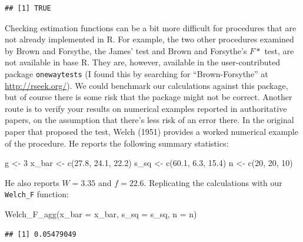 \documentclass[
]{book}
\newenvironment{Shaded}{\begin{snugshade}}{\end{snugshade}}
\newcommand{\AttributeTok}[1]{\textcolor[rgb]{0.77,0.63,0.00}{#1}}
\newcommand{\DecValTok}[1]{\textcolor[rgb]{0.00,0.00,0.81}{#1}}
\newcommand{\FloatTok}[1]{\textcolor[rgb]{0.00,0.00,0.81}{#1}}
\newcommand{\FunctionTok}[1]{\textcolor[rgb]{0.00,0.00,0.00}{#1}}
\newcommand{\NormalTok}[1]{#1}
\newcommand{\OtherTok}[1]{\textcolor[rgb]{0.56,0.35,0.01}{#1}}
\begin{document}
\begin{verbatim}
## [1] TRUE
\end{verbatim}

Checking estimation functions can be a bit more difficult for procedures that are not already implemented in R. For example, the two other procedures examined by Brown and Forsythe, the James' test and Brown and Forsythe's \(F*\) test, are not available in base R. They are, however, available in the user-contributed package \texttt{onewaytests} (I found this by searching for ``Brown-Forsythe'' at \url{http://rseek.org/}). We could benchmark our calculations against this package, but of course there is some risk that the package might not be correct. Another route is to verify your results on numerical examples reported in authoritative papers, on the assumption that there's less risk of an error there. In the original paper that proposed the test, Welch (1951) provides a worked numerical example of the procedure. He reports the following summary statistics:

\begin{Shaded}
\begin{Highlighting}[]
\NormalTok{g }\OtherTok{\textless{}{-}} \DecValTok{3}
\NormalTok{x\_bar }\OtherTok{\textless{}{-}} \FunctionTok{c}\NormalTok{(}\FloatTok{27.8}\NormalTok{, }\FloatTok{24.1}\NormalTok{, }\FloatTok{22.2}\NormalTok{)}
\NormalTok{s\_sq }\OtherTok{\textless{}{-}} \FunctionTok{c}\NormalTok{(}\FloatTok{60.1}\NormalTok{, }\FloatTok{6.3}\NormalTok{, }\FloatTok{15.4}\NormalTok{)}
\NormalTok{n }\OtherTok{\textless{}{-}} \FunctionTok{c}\NormalTok{(}\DecValTok{20}\NormalTok{, }\DecValTok{20}\NormalTok{, }\DecValTok{10}\NormalTok{)}
\end{Highlighting}
\end{Shaded}

He also reports \(W = 3.35\) and \(f = 22.6\). Replicating the calculations with our \texttt{Welch\_F} function:

\begin{Shaded}
\begin{Highlighting}[]
\FunctionTok{Welch\_F\_agg}\NormalTok{(}\AttributeTok{x\_bar =}\NormalTok{ x\_bar, }\AttributeTok{s\_sq =}\NormalTok{ s\_sq, }\AttributeTok{n =}\NormalTok{ n)}
\end{Highlighting}
\end{Shaded}

\begin{verbatim}
## [1] 0.05479049
\end{verbatim}
\end{document}
